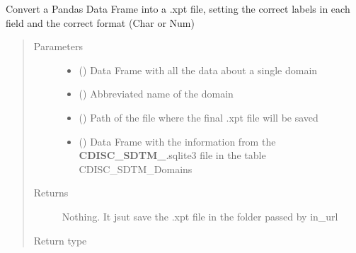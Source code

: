 \documentclass[letterpaper,10pt,english]{sphinxmanual}
\begin{document}

\begin{fulllineitems}
\label{\detokenize{CE_app:CE_app.nihpo_functions.func_nihpo_convert_to_sas}}
\sphinxAtStartPar
Convert a Pandas Data Frame into a .xpt file, setting the correct labels in each field and the correct format (Char or Num)
\begin{quote}\begin{description}
\item[{Parameters}] \leavevmode\begin{itemize}
\item {} 
\sphinxAtStartPar
{} () \textendash{} Data Frame with all the data about a single domain

\item {} 
\sphinxAtStartPar
{} () \textendash{} Abbreviated name of the domain

\item {} 
\sphinxAtStartPar
{} () \textendash{} Path of the file where the final .xpt file will be saved

\item {} 
\sphinxAtStartPar
{} () \textendash{} Data Frame with the information from the {\color{red}\bfseries{}CDISC\_SDTM\_}.sqlite3 file in the table CDISC\_SDTM\_Domains

\end{itemize}

\item[{Returns}] \leavevmode
\sphinxAtStartPar
Nothing. It jsut save the .xpt file in the folder passed by in\_url

\item[{Return type}] \leavevmode
\sphinxAtStartPar


\end{description}\end{quote}

\end{fulllineitems}
\end{document}
